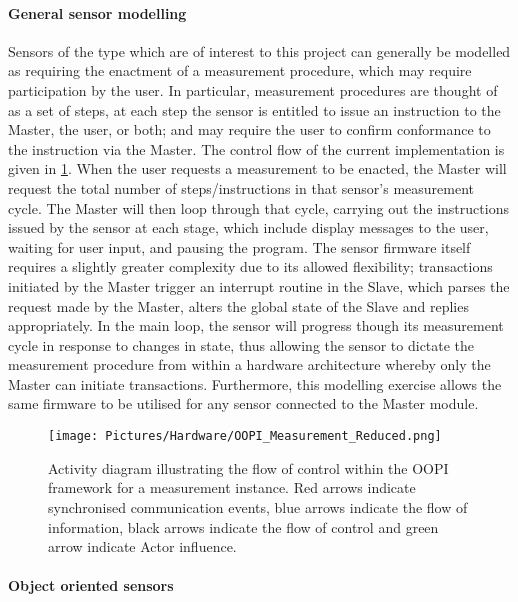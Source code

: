 \paragraph{General sensor modelling}
\label{sec:OOPI_General_Sensor}
Sensors of the type which are of interest to this project can generally be modelled as requiring the enactment of a measurement procedure, which may require participation by the user. In particular, measurement procedures are thought of as a set of steps, at each step the sensor is entitled to issue an instruction to the Master, the user, or both; and may require the user to confirm conformance to the instruction via the Master. The control flow of the current implementation is given in \cref{fig:OOPI_Measurement}. When the user requests a measurement to be enacted, the Master will request the total number of steps/instructions in that sensor's measurement cycle. The Master will then loop through that cycle, carrying out the instructions issued by the sensor at each stage, which include display messages to the user, waiting for user input, and pausing the program. The sensor firmware itself requires a slightly greater complexity due to its allowed flexibility; transactions initiated by the Master trigger an interrupt routine in the Slave, which parses the request made by the Master, alters the global state of the Slave and replies appropriately. In the main loop, the sensor will progress though its measurement cycle in response to changes in state, thus allowing the sensor to dictate the measurement procedure from within a hardware architecture whereby only the Master can initiate transactions. Furthermore, this modelling exercise allows the same firmware to be utilised for any sensor connected to the Master module.

    \begin{figure}[h!]
        \centering
        \texttt{[image: Pictures/Hardware/OOPI\_Measurement\_Reduced.png]}
        \caption{Activity diagram illustrating the flow of control within the OOPI framework for a measurement instance. Red arrows indicate synchronised communication events, blue arrows indicate the flow of information, black arrows indicate the flow of control and green arrow indicate Actor influence. }
        \label{fig:OOPI_Measurement}
    \end{figure}%
    

\paragraph{Object oriented sensors}

